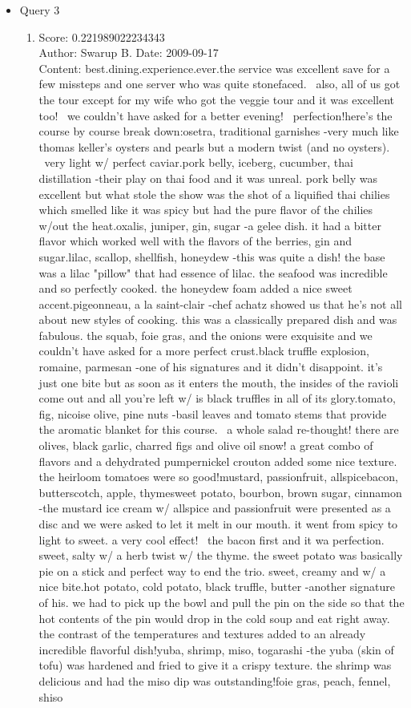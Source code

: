 \documentclass[paper=a4, fontsize=11pt]{jhwhw} %
\begin{document}
\begin{itemize}
    \item Query 3
        \begin{enumerate}
            \item Score: 0.221989022234343\\
                Author: Swarup B.
                Date: 2009-09-17\\
                Content: best.dining.experience.ever.the service was excellent save for a few missteps and one server who was quite stonefaced.  also, all of us got the tour except for my wife who got the veggie tour and it was excellent too!  we couldn't have asked for a better evening!  perfection!here's the course by course break down:osetra, traditional garnishes -very much like thomas keller's oysters and pearls but a modern twist (and no oysters).  very light w/ perfect caviar.pork belly, iceberg, cucumber, thai distillation -their play on thai food and it was unreal. pork belly was excellent but what stole the show was the shot of a liquified thai chilies which smelled like it was spicy but had the pure flavor of the chilies w/out the heat.oxalis, juniper, gin, sugar -a gelee dish. it had a bitter flavor which worked well with the flavors of the berries, gin and sugar.lilac, scallop, shellfish, honeydew -this was quite a dish! the base was a lilac "pillow" that had essence of lilac. the seafood was incredible and so perfectly cooked. the honeydew foam added a nice sweet accent.pigeonneau, a la saint-clair -chef achatz showed us that he's not all about new styles of cooking. this was a classically prepared dish and was fabulous. the squab, foie gras, and the onions were exquisite and we couldn't have asked for a more perfect crust.black truffle explosion, romaine, parmesan -one of his signatures and it didn't disappoint. it's just one bite but as soon as it enters the mouth, the insides of the ravioli come out and all you're left w/ is black truffles in all of its glory.tomato, fig, nicoise olive, pine nuts -basil leaves and tomato stems that provide the aromatic blanket for this course.  a whole salad re-thought! there are olives, black garlic, charred figs and olive oil snow! a great combo of flavors and a dehydrated pumpernickel crouton added some nice texture. the heirloom tomatoes were so good!mustard, passionfruit, allspicebacon, butterscotch, apple, thymesweet potato, bourbon, brown sugar, cinnamon -the mustard ice cream w/ allspice and passionfruit were presented as a disc and we were asked to let it melt in our mouth. it went from spicy to light to sweet. a very cool effect!  the bacon first and it wa perfection. sweet, salty w/ a herb twist w/ the thyme. the sweet potato was basically pie on a stick and perfect way to end the trio. sweet, creamy and w/ a nice bite.hot potato, cold potato, black truffle, butter -another signature of his. we had to pick up the bowl and pull the pin on the side so that the hot contents of the pin would drop in the cold soup and eat right away. the contrast of the temperatures and textures added to an already incredible flavorful dish!yuba, shrimp, miso, togarashi -the yuba (skin of tofu) was hardened and fried to give it a crispy texture. the shrimp was delicious and had the miso dip was outstanding!foie gras, peach, fennel, shiso 
\end{enumerate}
\end{itemize}
\end{document}
